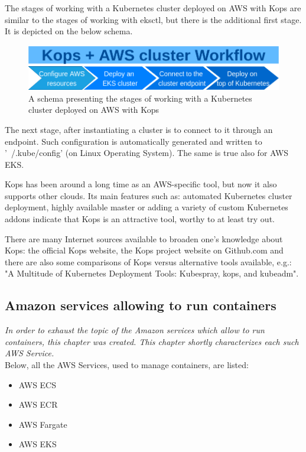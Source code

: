 The stages of working with a Kubernetes cluster deployed on AWS with Kops are similar to the stages of working with eksctl, but there is the additional first stage. It is depicted on the below schema.
\begin{figure}[H]
    \centering
    \includegraphics[width=12cm]{figures/kops-aws-workflow.png}
    \captionsetup{justification=centering,margin=2cm}
    \caption{A schema presenting the stages of working with a Kubernetes cluster deployed on AWS with Kops}
\end{figure}

The next stage, after instantiating a cluster is to connect to it through an endpoint. Such configuration is automatically generated and written to '~/.kube/config' (on Linux Operating System)\cite{online-kops-aws}. The same is true also for AWS EKS.

Kops has been around a long time as an AWS-specific tool, but now it also supports other clouds\cite{book-cndwk}\cite{online-kops-gh}. Its main features such as: automated Kubernetes cluster deployment, highly available master or adding a variety of custom Kubernetes addons\cite{kops-addons} indicate that Kops is an attractive tool, worthy to at least try out.

There are many Internet sources available to broaden one's knowledge about Kops: the official Kops website\cite{online-kops}, the Kops project website on Github.com\cite{online-kops-gh} and there are also some comparisons of Kops versus alternative tools available, e.g.: "A Multitude of Kubernetes Deployment Tools: Kubespray, kops, and kubeadm"\cite{online-kops-blog}.

\subsection{Amazon services allowing to run containers}
\textit{In order to exhaust the topic of the Amazon services which allow to run containers, this chapter was created. This chapter shortly characterizes each such AWS Service.}
\\

Below, all the AWS Services, used to manage containers, are listed:
\begin{itemize}
\item AWS ECS
\item AWS ECR
\item AWS Fargate
\item AWS EKS
\end{itemize}

